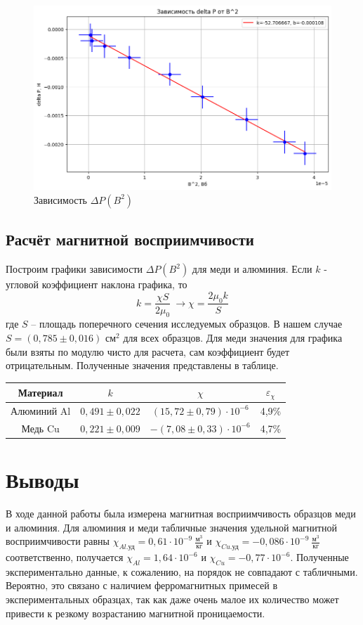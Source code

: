 \documentclass[a4paper, 12pt]{article}
\begin{document}
	\begin{figure}[h!]
		\centering
		\includegraphics[width = \textwidth]{data/data2.png}
		\caption{Зависимость $\Delta P(B^2)$}
	\end{figure}

	\subsection*{Расчёт магнитной восприимчивости}
	Построим графики зависимости $\Delta P(B^2)$ для меди и алюминия. Если $k$ - угловой коэффициент наклона графика, то
	\[k = \frac{\chi S}{2\mu_0} \ \rightarrow \chi = \frac{2\mu_0 k}{S}\]
	где $ S $ -- площадь поперечного сечения исследуемых образцов. В нашем случае $ S = (0,785 \pm 0,016) $ см$ ^2 $ для всех образцов.
	Для меди значения для графика были взяты по модулю чисто для расчета, сам коэффициент будет отрицательным. Полученные значения представлены в таблице.

	
	\begin{table}[h!]
		\centering
		\begin{tabular}{|c|c|c|c|}
			\hline
			Материал & $k$ & $\chi$ & $\varepsilon_{\chi}$ \\ \hline
			Алюминий Al & $0,491 \pm 0,022$ & $(15,72 \pm 0,79) \cdot 10^{-6}$ & 4,9\% \\ \hline
			Медь Cu & $0,221 \pm 0,009$ & $-(7,08 \pm 0,33) \cdot 10^{-6}$ & 4,7\% \\ \hline
		\end{tabular}
	\end{table}
	\newpage
	\section*{Выводы}
	
	В ходе данной работы была измерена магнитная восприимчивость образцов меди и алюминия. Для алюминия и меди табличные значения удельной магнитной восприимчивости равны $ \chi_{Al.\text{уд}} = 0,61\cdot 10^{-9} \ \frac{\text{м}^3}{\text{кг}}$ и $ \chi_{Cu.\text{уд}} = -0,086 \cdot 10^{-9} \ \frac{\text{м}^3}{\text{кг}} $ соответственно, получается $\chi_{Al} = 1,64 \cdot 10^{-6}$ и $\chi_{Cu} = -0,77 \cdot 10^{-6}$. Полученные экспериментально данные, к сожалению, на порядок не совпадают с табличными. Вероятно, это связано с наличием ферромагнитных примесей в экспериментальных образцах, так как даже очень малое их количество может привести к резкому возрастанию магнитной проницаемости.
	
\end{document}
